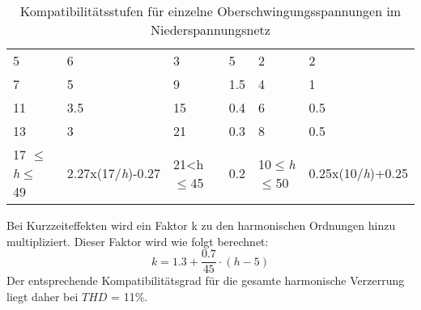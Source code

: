 \begin{appendix}
\begin{table}[ht!]
{\begin{tabular}{|l|l|l|l|l|l|}
			5                                                         & 6                                                     & 3                                                       & 5                                                & 2                                           & 2                                         \\
			7                                                         & 5                                                     & 9                                                       & 1.5                                              & 4                                           & 1                                         \\
			11                                                        & 3.5                                                   & 15                                                      & 0.4                                              & 6                                           & 0.5                                       \\
			13                                                        & 3                                                     & 21                                                      & 0.3                                              & 8                                           & 0.5                                       \\
			17 $\leq$\textit{h}$\leq$ 49                                                   & 2.27x(17/\textit{h})-0.27                                   & 21<h$\leq$45                                                 & 0.2                                              & 10$\leq$\textit{h}$\leq$50                                     & 0.25x(10/\textit{h})+0.25                       \\ \hline
	\end{tabular}}
	\caption{Kompatibilitätsstufen für einzelne Oberschwingungsspannungen im Niederspannungsnetz}\label{tab:kompatibilitätsstufen_ZF}
\end{table}

Bei Kurzzeiteffekten wird ein Faktor k zu den harmonischen Ordnungen hinzu multipliziert. Dieser Faktor wird wie folgt berechnet: 
\begin{equation}\label{eq:factor_k_für_kurzzeiteffekte_ZF}
k = {1.3+\frac{0.7}{45}\cdot(h-5)}
\end{equation}
Der entsprechende Kompatibilitätsgrad für die gesamte harmonische Verzerrung liegt daher bei $THD$ = 11\%.




\end{appendix}
